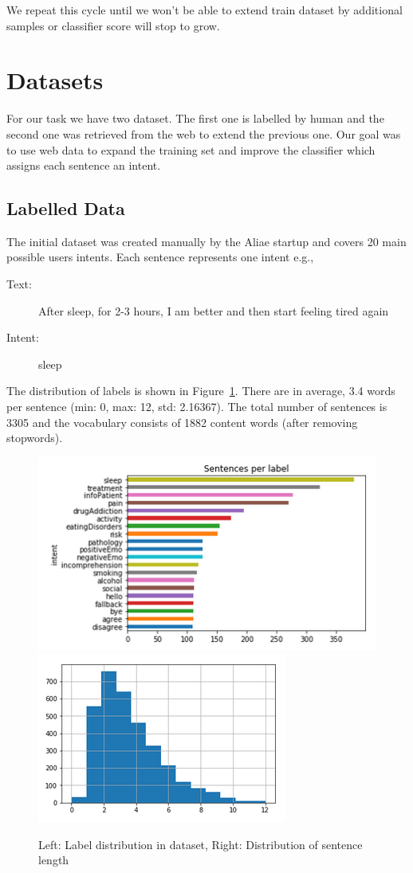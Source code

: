 \documentclass[11pt]{article}
\begin{document}
We repeat this cycle until we won't be able to extend train dataset by additional samples or classifier score will stop to grow.

\section{Datasets}
\label{sec:datasets}

For our task we have two dataset. The first one is labelled by human and the second one was retrieved from the web to extend the previous one. Our goal was to use web data to expand the training set and improve the classifier which assigns each sentence an intent. 

\subsection{Labelled Data}
\label{subsec:labelleddata}
The initial dataset was created manually by the Aliae startup and  covers 20 main possible users intents. Each sentence represents one intent e.g., 
\begin{description}
\item[Text:] After sleep, for 2-3 hours, I am better and then start feeling tired again
\item[Intent:] sleep
\end{description}

The distribution of labels is shown in Figure~\ref{figure:name}. There
are in average, 3.4 words per sentence (min: 0, max: 12, std:
2.16367).  The total number of sentences is 3305 and the vocabulary
consists of 1882 content words (after removing stopwords).

 \begin{figure}[h]
 	\centering
 	\includegraphics[scale=0.4]{report1.png}
	\includegraphics[scale=0.45]{report4.png}	
	\caption{Left: Label distribution in dataset, Right: Distribution of sentence length}
 \label{figure:name}
 \end{figure}
\FloatBarrier
\end{document}
